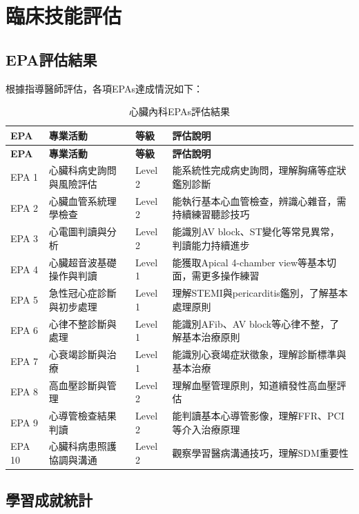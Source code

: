 \documentclass[12pt,a4paper]{article}
\begin{document}
\section{臨床技能評估}

\subsection{EPA評估結果}

根據指導醫師評估，各項EPAs達成情況如下：

\begin{longtable}{|p{1cm}|p{6cm}|p{2cm}|p{5cm}|}
\caption{心臟內科EPAs評估結果} \\
\hline
\textbf{EPA} & \textbf{專業活動} & \textbf{等級} & \textbf{評估說明} \\
\hline
\endfirsthead
\hline
\textbf{EPA} & \textbf{專業活動} & \textbf{等級} & \textbf{評估說明} \\
\hline
\endhead

EPA 1 & 心臟科病史詢問與風險評估 & Level 2 & 能系統性完成病史詢問，理解胸痛等症狀鑑別診斷 \\
\hline
EPA 2 & 心臟血管系統理學檢查 & Level 2 & 能執行基本心血管檢查，辨識心雜音，需持續練習聽診技巧 \\
\hline  
EPA 3 & 心電圖判讀與分析 & Level 2 & 能識別AV block、ST變化等常見異常，判讀能力持續進步 \\
\hline
EPA 4 & 心臟超音波基礎操作與判讀 & Level 1 & 能獲取Apical 4-chamber view等基本切面，需更多操作練習 \\
\hline
EPA 5 & 急性冠心症診斷與初步處理 & Level 1 & 理解STEMI與pericarditis鑑別，了解基本處理原則 \\
\hline
EPA 6 & 心律不整診斷與處理 & Level 1 & 能識別AFib、AV block等心律不整，了解基本治療原則 \\
\hline
EPA 7 & 心衰竭診斷與治療 & Level 1 & 能識別心衰竭症狀徵象，理解診斷標準與基本治療 \\
\hline
EPA 8 & 高血壓診斷與管理 & Level 2 & 理解血壓管理原則，知道續發性高血壓評估 \\
\hline
EPA 9 & 心導管檢查結果判讀 & Level 2 & 能判讀基本心導管影像，理解FFR、PCI等介入治療原理 \\
\hline
EPA 10 & 心臟科病患照護協調與溝通 & Level 2 & 觀察學習醫病溝通技巧，理解SDM重要性 \\
\hline
\end{longtable}

\subsection{學習成就統計}
\end{document}
